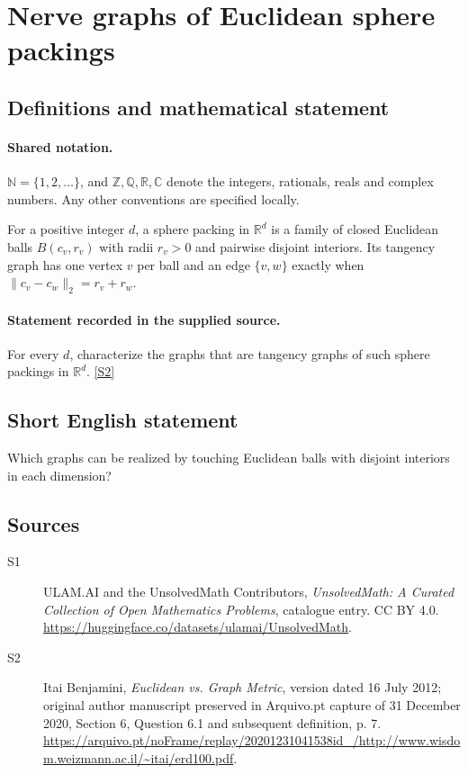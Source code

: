 \documentclass[11pt]{article}
\newcommand{\sref}[2]{\hyperlink{source:#1:#2}{[S#2]}}
\begin{document}
\section{Nerve graphs of Euclidean sphere packings}\label{statement}

\subsection{Definitions and mathematical statement}

\paragraph{Shared notation.}$\mathbb N=\{1,2,\ldots\}$, and $\mathbb Z,\mathbb Q,\mathbb R,\mathbb C$ denote the integers, rationals, reals and complex numbers. Any other conventions are specified locally.


For a positive integer $d$, a sphere packing in $\mathbb R^d$ is a family of closed Euclidean balls $B(c_v,r_v)$ with radii $r_v>0$ and pairwise disjoint interiors. Its tangency graph has one vertex $v$ per ball and an edge $\{v,w\}$ exactly when $\|c_v-c_w\|_2=r_v+r_w$.
\paragraph{Statement recorded in the supplied source.}
For every $d$, characterize the graphs that are tangency graphs of such sphere packings in $\mathbb R^d$. \sref{statement}{2}
\subsection{Short English statement}
Which graphs can be realized by touching Euclidean balls with disjoint interiors in each dimension?
\subsection{Sources}
\begin{description}
\item[\hypertarget{source:statement:1}{S1}] ULAM.AI and the UnsolvedMath Contributors, \emph{UnsolvedMath: A Curated Collection of Open Mathematics Problems}, catalogue entry. CC BY 4.0. \url{https://huggingface.co/datasets/ulamai/UnsolvedMath}.
\item[\hypertarget{source:statement:2}{S2}] Itai Benjamini, \emph{Euclidean vs. Graph Metric}, version dated 16 July 2012; original author manuscript preserved in Arquivo.pt capture of 31 December 2020, Section 6, Question 6.1 and subsequent definition, p. 7. \url{https://arquivo.pt/noFrame/replay/20201231041538id_/http://www.wisdom.weizmann.ac.il/~itai/erd100.pdf}.
\end{description}
\label{end:statement}
\end{document}
